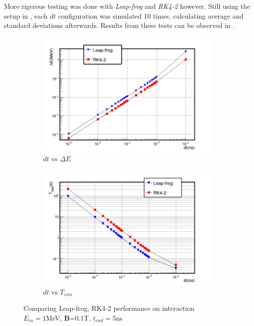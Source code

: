 \documentclass[a4paper,oneside,12pt]{report}
\numberwithin{equation}{chapter}
\begin{document}
More rigerous testing was done with \textit{Leap-frog} and \textit{RK4-2} however. 
Still using the setup in , each $dt$ configuration was simulated 10 times, calculating average and standard deviations afterwards.
Results from these tests can be observed in .
\begin{figure}
    \captionsetup[subfigure]{justification=centering}
    \captionsetup{justification=centering}
    \centering
    \begin{subfigure}{0.8\textwidth}
        \centering
        \includegraphics[width=\linewidth]{./figures/analiz/mag_lf_rk2_dt-E.png}
        \caption*{$dt$ vs $\Delta E$}
    \end{subfigure}
    
    \begin{subfigure}{0.8\textwidth}
        \centering
        \includegraphics[width=\linewidth]{./figures/analiz/mag_lf_rk2_dt-Tsim.png}
        \caption*{$dt$ vs $T_{sim}$}
    \end{subfigure}
    \caption{Comparing Leap-frog, RK4-2 performance on \eB interaction\\ $E_{in}=1$MeV, \textbf{B}=$0.1$T, $t_{end}=5$ns}
    \label{fig:mag_lf_rk2_comparison}
\end{figure}
\end{document}
